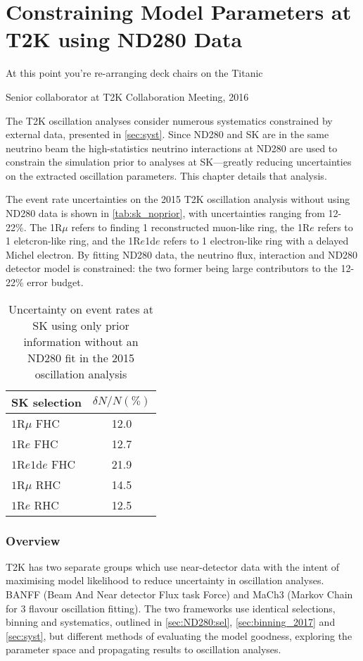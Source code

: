 \chapter{Constraining Model Parameters at T2K using ND280 Data}
\label{chap:ND280}

\epigraph{At this point you're re-arranging deck chairs on the Titanic}{Senior collaborator at T2K Collaboration Meeting, 2016}

The T2K oscillation analyses consider numerous systematics constrained by external data, presented in \autoref{sec:syst}. Since ND280 and SK are in the same neutrino beam the high-statistics neutrino interactions at ND280 are used to constrain the simulation prior to analyses at SK---greatly reducing uncertainties on the extracted oscillation parameters. This chapter details that analysis.

The event rate uncertainties on the 2015 T2K oscillation analysis without using ND280 data is shown in \autoref{tab:sk_noprior}, with uncertainties ranging from 12-22\%. The 1R$\mu$ refers to finding 1 reconstructed muon-like ring, the 1R$e$ refers to 1 eletcron-like ring, and the 1R$e$1d$e$ refers to 1 electron-like ring with a delayed Michel electron. By fitting ND280 data, the neutrino flux, interaction and ND280 detector model is constrained: the two former being large contributors to the 12-22\% error budget.
\begin{table}[h]
	\begin{tabular}{l | c}
		\hline
		\hline
		SK selection & $\delta N/N (\%)$ \\
		\hline
		$1\text{R}\mu$ FHC & 12.0 \\
		$1\text{R}e$ FHC & 12.7 \\
		$1\text{R}e1\text{d}e$ FHC & 21.9 \\
		\hline
		$1\text{R}\mu$ RHC & 14.5 \\
		$1\text{R}e$ RHC & 12.5 \\
		\hline
		\hline
	\end{tabular}
	\caption{Uncertainty on event rates at SK using only prior information without an ND280 fit in the 2015 oscillation analysis\cite{t2k_2015}}
	\label{tab:sk_noprior}
\end{table}

\subsection{Overview}
T2K has two separate groups which use near-detector data with the intent of maximising model likelihood to reduce uncertainty in oscillation analyses. BANFF (Beam And Near detector Flux task Force) and MaCh3 (Markov Chain for 3 flavour oscillation fitting). The two frameworks use identical selections, binning and systematics, outlined in \autoref{sec:ND280:sel}, \autoref{sec:binning_2017} and \autoref{sec:syst}, but different methods of evaluating the model goodness, exploring the parameter space and propagating results to oscillation analyses.

